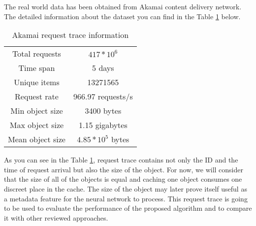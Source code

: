 The real world data has been obtained from Akamai content delivery network\cite{12}. The detailed information about the dataset you can find in the Table \ref{table:1} below.

\begin{table}[h!]
	\centering
	\begin{tabular}{| c | c |}
		\hline 
		Total requests & $ 417 * 10^6 $ \\ 
		Time span & 5 days \\
		Unique items & 13271565 \\
		Request rate & 966.97 requests/s \\
		Min object size & 3400 bytes \\
		Max object size & 1.15 gigabytes \\ 
		Mean object size & $ 4.85 * 10^5 $ bytes \\
		\hline
	\end{tabular}
	\caption{Akamai request trace information}
	\label{table:1}
\end{table}

As you can see in the Table \ref{table:1}, request trace contains not only the ID and the time of request arrival but also the size of the object. For now, we will consider that the size of all of the objects is equal and caching one object consumes one discreet place in the cache. The size of the object may later prove itself useful as a metadata feature for the neural network to process. This request trace is going to be used to evaluate the performance of the proposed algorithm and to compare it with other reviewed approaches. 